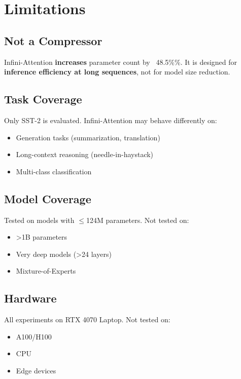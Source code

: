 
\section{Limitations}

\subsection{Not a Compressor}

Infini-Attention \textbf{increases} parameter count by ~48.5\%\%. It is 
designed for \textbf{inference efficiency at long sequences}, not for model 
size reduction.

\subsection{Task Coverage}

Only SST-2 is evaluated. Infini-Attention may behave differently on:

\begin{itemize}
\item Generation tasks (summarization, translation)
\item Long-context reasoning (needle-in-haystack)
\item Multi-class classification

\end{itemize}
\subsection{Model Coverage}

Tested on models with $\le$124M parameters. Not tested on:

\begin{itemize}
\item \textgreater{}1B parameters
\item Very deep models (\textgreater{}24 layers)
\item Mixture-of-Experts

\end{itemize}
\subsection{Hardware}

All experiments on RTX 4070 Laptop. Not tested on:

\begin{itemize}
\item A100/H100
\item CPU
\item Edge devices

\end{itemize}
